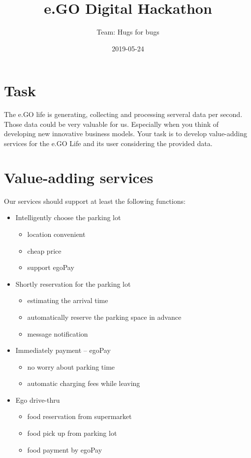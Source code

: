 \documentclass[]{book}
\title{e.GO Digital Hackathon}
\author{Team: Hugs for bugs}
\date{2019-05-24}
\providecommand{\tightlist}{%
  \setlength{\itemsep}{0pt}\setlength{\parskip}{0pt}}
\begin{document}
\maketitle

{
\setcounter{tocdepth}{1}
\tableofcontents
}
\hypertarget{task}{%
\chapter{Task}\label{task}}

The e.GO life is generating, collecting and processing serveral data per second. Those data could be very valuable for us. Especially when you think of developing new innovative business models. Your task is to develop value-adding services for the e.GO Life and its user considering the provided data.

\hypertarget{value-adding-services}{%
\chapter{Value-adding services}\label{value-adding-services}}

Our services should support at least the following functions:

\begin{itemize}
\tightlist
\item
  Intelligently choose the parking lot

  \begin{itemize}
  \tightlist
  \item
    location convenient
  \item
    cheap price
  \item
    support egoPay
  \end{itemize}
\item
  Shortly reservation for the parking lot

  \begin{itemize}
  \tightlist
  \item
    estimating the arrival time
  \item
    automatically reserve the parking space in advance
  \item
    message notification
  \end{itemize}
\item
  Immediately payment -- egoPay

  \begin{itemize}
  \tightlist
  \item
    no worry about parking time
  \item
    automatic charging fees while leaving
  \end{itemize}
\item
  Ego drive-thru

  \begin{itemize}
  \tightlist
  \item
    food reservation from supermarket
  \item
    food pick up from parking lot
  \item
    food payment by egoPay
  \end{itemize}
\end{itemize}
\end{document}
